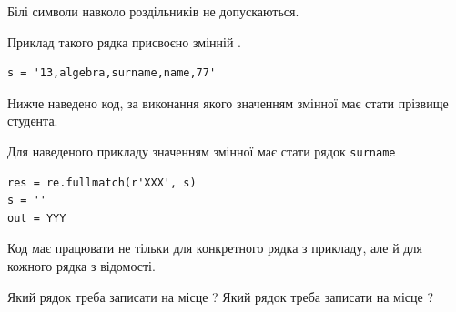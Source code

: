 \documentclass[12pt, ukrainian]{article}
\def\code#1{\Verb!#1!}
\begin{document}
{Білі символи навколо роздільників не допускаються.

Приклад такого рядка присвоєно змінній .



\begin{verbatim}
s = '13,algebra,surname,name,77'
\end{verbatim}


Нижче наведено код, за виконання якого значенням змінної  має стати прізвище студента.

Для наведеного прикладу значенням змінної  має стати рядок \code{surname}



\begin{verbatim}
res = re.fullmatch(r'XXX', s)
s = ''
out = YYY
\end{verbatim}


Код має працювати не тільки для конкретного рядка з прикладу, але й для кожного рядка з відомості.


Який рядок треба записати на місце  ?
Який рядок треба записати на місце  ?\par

}
\newpage
\end{document}
